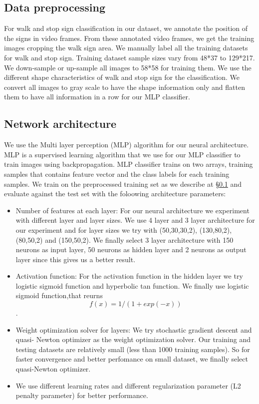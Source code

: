 \subsection{Data preprocessing}
\label{s:prepro}
For walk and stop sign classification in our dataset, we annotate the position of the signs in video frames.
From these annotated video frames, we get the training images cropping the walk sign area.
We manually label all the training datasets for walk and stop sign.
Training dataset sample sizes vary from 48*37 to 129*217.
We down-sample or up-sample all images to 58*58 for training them.
We use the different shape characteristics of walk and stop sign for the classification.
We convert all images to gray scale to have the shape information only and flatten them to have all information in a row for our MLP classifier.

\subsection{Network architecture}
\label{s:neural}
We use the Multi layer perception (MLP) algorithm for our neural architecture.
MLP is a supervised learning algorithm that we use for our MLP classifier to train images using backpropagation.
MLP classifier trains on two arrays, training samples that contains feature vector and the class labels for each training samples.
We train on the preprocessed training set as we describe at \S\ref{s:prepro} and evaluate against the test set with the foloowing architecture parameters:

\begin{itemize}
\item Number of features at each layer: For our neural architecture we experiment with different layer and layer sizes.
We use 4 layer and 3 layer architecture for our experiment and for layer sizes we try with (50,30,30,2), (130,80,2),(80,50,2) and (150,50,2).
We finally select 3 layer architecture with 150 neurons as input layer, 50 neurons as hidden layer and 2 neurons as output layer since this gives us a better result.
\item Activation function: For the activation function in the hidden layer we try logistic sigmoid function and hyperbolic tan function.
  We finally use logistic sigmoid function,that reurns $$f(x)= 1/(1+exp(-x))$$.
\item Weight optimization solver for layers: We try stochastic gradient descent and quasi- Newton optimizer as the weight optimization solver.
  Our training and testing datasets are relatively small (less than 1000 training samples).
  So for faster convergence and better perfomance on small dataset, we finally select quasi-Newton optimizer.

\item We use different learning rates and different regularization parameter (L2 penalty parameter) for better performance.   
\end{itemize}



